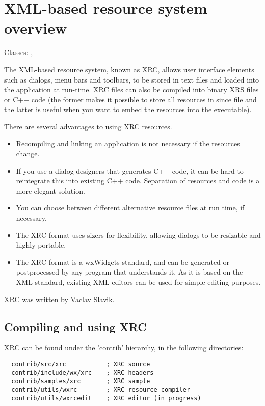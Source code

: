 %
\section{XML-based resource system overview}\label{xrcoverview}

Classes: , 

The XML-based resource system, known as XRC, allows user interface elements such as
dialogs, menu bars and toolbars, to be stored in text files and loaded into
the application at run-time. XRC files can also be compiled into binary XRS files or C++
code (the former makes it possible to store all resources in since file and the latter
is useful when you want to embed the resources into the executable).

There are several advantages to using XRC resources.

\begin{itemize}\itemsep=0pt
\item Recompiling and linking an application is not necessary if the
resources change.
\item If you use a dialog designers that generates C++ code, it can be hard
to reintegrate this into existing C++ code. Separation of resources and code
is a more elegant solution.
\item You can choose between different alternative resource files at run time, if necessary.
\item The XRC format uses sizers for flexibility, allowing dialogs to be resizable
and highly portable.
\item The XRC format is a wxWidgets standard,
and can be generated or postprocessed by any program that understands it. As it is based
on the XML standard, existing XML editors can be used for simple editing purposes.
\end{itemize}

XRC was written by Vaclav Slavik.

\subsection{Compiling and using XRC}\label{compilingxrc}

XRC can be found under the 'contrib' hierarchy, in the following directories:

\begin{verbatim}
  contrib/src/xrc           ; XRC source
  contrib/include/wx/xrc    ; XRC headers
  contrib/samples/xrc       ; XRC sample
  contrib/utils/wxrc        ; XRC resource compiler
  contrib/utils/wxrcedit    ; XRC editor (in progress)
\end{verbatim}

